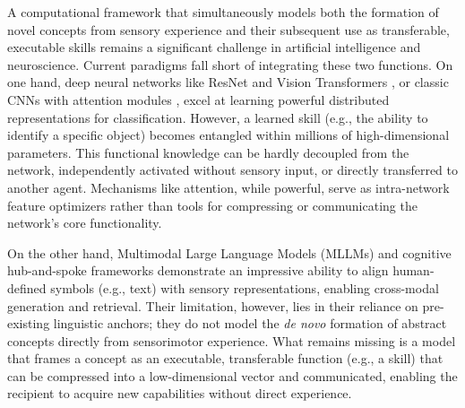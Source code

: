 \documentclass[pdflatex,sn-mathphys-num,lineno]{sn-jnl}%
\begin{document}
\begin{CJK}{UTF8}{gbsn}
A computational framework that simultaneously models both the formation of novel concepts from sensory experience and their subsequent use as transferable, executable skills remains a significant challenge in artificial intelligence and neuroscience. Current paradigms fall short of integrating these two functions. On one hand, deep neural networks like ResNet and Vision Transformers \cite{he_deep_2016,dosovitskiy_image_2021}, or classic CNNs with attention modules \cite{hu_squeeze-and-excitation_2018,woo_cbam_2018}, excel at learning powerful distributed representations for classification. However, a learned skill (e.g., the ability to identify a specific object) becomes entangled within millions of high-dimensional parameters. This functional knowledge can be hardly decoupled from the network, independently activated without sensory input, or directly transferred to another agent. Mechanisms like attention, while powerful, serve as intra-network feature optimizers rather than tools for compressing or communicating the network's core functionality.

On the other hand, Multimodal Large Language Models (MLLMs) \cite{radford_learning_2021,li_blip-2_2023,wu_deepseek-vl2_2024} and cognitive hub-and-spoke frameworks \cite{ralph_neural_2017,jackson_reverse-engineering_2021} demonstrate an impressive ability to align human-defined symbols (e.g., text) with sensory representations, enabling cross-modal generation and retrieval. Their limitation, however, lies in their reliance on pre-existing linguistic anchors; they do not model the \textit{de novo} formation of abstract concepts directly from sensorimotor experience. What remains missing is a model that frames a concept as an executable, transferable function (e.g., a skill) that can be compressed into a low-dimensional vector and communicated, enabling the recipient to acquire new capabilities without direct experience.


\end{CJK}
\end{document}
